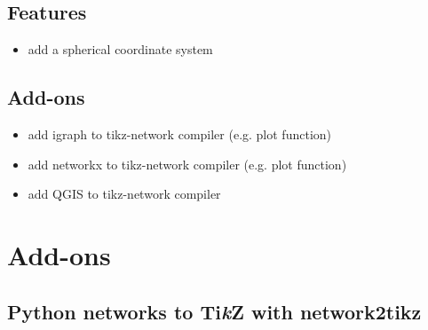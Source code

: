 \documentclass[a4paper,twosided,notoc]{tufte-book}
\newcommand{\tikzsym}{Ti\emph{k}Z }
\begin{document}
\section{Features}
\begin{itemize}
\item add a spherical coordinate system
\end{itemize}

\section{Add-ons}
\begin{itemize}
\item add igraph to tikz-network compiler (e.g. plot function)
\item add networkx to tikz-network compiler (e.g. plot function)
\item add QGIS to tikz-network compiler
\end{itemize}


\chapter{Add-ons}
\label{chap:todo}

\section{Python networks to \tikzsym with network2tikz}
\label{sec:python_to_tikz}










\backmatter





\printindex
\end{document}

